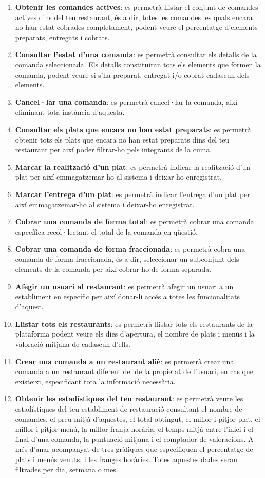 \begin{enumerate}
\item \textbf{Obtenir les comandes actives}: es permetrà llistar el conjunt de comandes actives dins del teu restaurant, és a dir, totes les comandes les quals encara no han estat cobrades completament, podent veure el percentatge d'elements preparats, entregats i cobrats.
\item \textbf{Consultar l'estat d'una comanda}: es permetrà consultar els detalls de la comanda seleccionada. Els detalls constituiran tots els elements que formen la comanda, podent veure si s'ha preparat, entregat i/o cobrat cadascun dels elements.
\item \textbf{Cancel·lar una comanda}: es permetrà cancel·lar la comanda, així eliminant tota instància d'aquesta.
\item \textbf{Consultar els plats que encara no han estat preparats}: es permetrà obtenir tots els plats que encara no han estat preparats dins del teu restaurant per així poder filtrar-ho pels integrants de la cuina.
\item \textbf{Marcar la realització d'un plat}: es permetrà indicar la realització d'un plat per així emmagatzemar-ho al sistema i deixar-ho enregistrat.
\item \textbf{Marcar l'entrega d'un plat}: es permetrà indicar l'entrega d'un plat per així emmagatzemar-ho al sistema i deixar-ho enregistrat.
\item \textbf{Cobrar una comanda de forma total}: es permetrà cobrar una comanda específica recol·lectant el total de la comanda en qüestió.
\item \textbf{Cobrar una comanda de forma fraccionada}: es permetrà cobra una comanda de forma fraccionada, és a dir, seleccionar un subconjunt dels elements de la comanda per així cobrar-ho de forma separada.
\item \textbf{Afegir un usuari al restaurant}: es permetrà afegir un usuari a un establiment en específic per així donar-li accés a totes les funcionalitats d'aquest.
\item \textbf{Llistar tots els restaurants}: es permetrà llistar tots els restaurants de la plataforma podent veure els dies d'apertura, el nombre de plats i menús i la valoració mitjana de cadascun d'ells.
\item \textbf{Crear una comanda a un restaurant aliè}: es permetrà crear una comanda a un restaurant diferent del de la propietat de l'usuari, en cas que existeixi, especificant tota la informació necessària.
\item \textbf{Obtenir les estadístiques del teu restaurant}: es permetrà veure les estadístiques del teu establiment de restauració consultant el nombre de comandes, el preu mitjà d'aquestes, el total obtingut, el millor i pitjor plat, el millor i pitjor menú, la millor franja horària, el temps mitjà entre l'inici i el final d'una comanda, la puntuació mitjana i el comptador de valoracions. A més d'anar acompanyat de tres gràfiques que especifiquen el percentatge de plats i menús venuts, i les franges horàries. Totes aquestes dades seran filtrades per dia, setmana o mes.

\end{enumerate}
